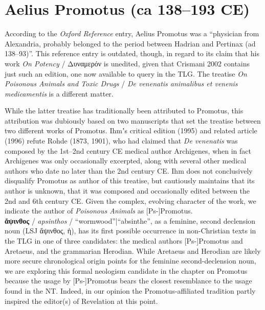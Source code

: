 %
%
\chapter{Aelius Promotus (ca 138--193 CE)}%
\vspace*{3mm} %
\justifying %

\noindent{}According to the \textit{Oxford Reference} entry, %
Aelius Promotus was a “physician from Alexandria, probably belonged to the period between Hadrian and Pertinax (ad 138--93)”. %
This reference entry is outdated, though, %
in regard to its claim that his work \textit{On Potency} / Δυναμερόν is unedited, %
given that Crismani 2002 contains just such an edition, %
one now available to query in the TLG. %
The treatise \textit{On Poisonous Animals and Toxic Drugs} / %
\textit{De venenatis animalibus et venenis medicamentis} %
is a different matter. %

While the latter treatise has traditionally been attributed to Promotus, %
this attribution was dubiously based on two manuscripts that set the treatise between two different works of Promotus. %
Ihmʼs critical edition (1995) and related article (1996) refute Rohde (1873, 1901), %
who had claimed that \textit{De venenatis} was composed by the 1st--2nd century CE medical author Archigenes, %
when in fact Archigenes was only occasionally excerpted, %
along with several other medical authors who date no later than the 2nd century CE. %
Ihm does not conclusively disqualify Promotus as author of this treatise, %
but cautiously maintains that its author is unknown, %
that it was composed and occasionally edited between the 2nd and 6th century CE. %
Given the complex, evolving character of the work, we indicate the author of \textit{Poisonous Animals} as [Ps-]Promotus. %
\\[1mm] %

\noindent{}\textbf{ἄψινθος} / \textit{apsinthos} / “wormwood”|“absinthe”, %
as a feminine, second declension noun (LSJ ἄψινθος, ἡ), %
has its first possible occurrence in non-Christian texts in the TLG in one of three candidates: %
the medical authors [Ps-]Promotus and Aretaeus, and the grammarian Herodian. %
While Aretaeus and Herodian are likely more secure chronological origin points for the feminine second-declension noun, %
we are exploring this formal neologism candidate in the chapter on Promotus because the usage by [Ps-]Promotus %
bears the closest resemblance to the usage found in the NT. %
Indeed, in our opinion the Promotus-affiliated tradition partly inspired the editor(s) of Revelation at this point. %

